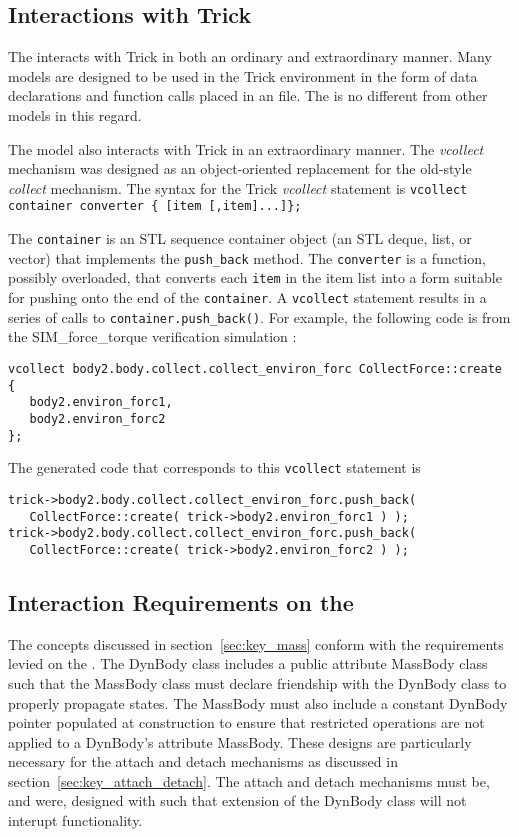 \subsection{Interactions with Trick}\label{sec:spec_interactions_trick}
The \ModelDesc interacts with Trick in both an ordinary and extraordinary
manner. Many models are designed to be used in the Trick environment in the
form of data declarations and function calls placed in an \Sdefine file. The
\ModelDesc is no different from other models in this regard.

The model also interacts with Trick in an extraordinary manner.
The \emph{vcollect} mechanism was designed as an object-oriented
replacement for the old-style \emph{collect} mechanism. The syntax for the
Trick \emph{vcollect} statement is
\verb+vcollect container converter { [item [,item]...]};+

The \verb+container+ is an STL sequence container object (an STL deque, list,
or vector) that implements the \verb+push_back+ method.
The \verb+converter+ is a function, possibly overloaded, that converts each
\verb+item+ in the item list into a form suitable for pushing onto the end of
the \verb+container+.
A \verb+vcollect+ statement results in a series of calls to
\verb+container.push_back()+. For example, the following code is from the
SIM\_force\_torque verification simulation \Sdefine:

\begin{verbatim}
vcollect body2.body.collect.collect_environ_forc CollectForce::create {
   body2.environ_forc1,
   body2.environ_forc2
};
\end{verbatim}

The generated code that corresponds to this \verb+vcollect+ statement is

\begin{verbatim}
trick->body2.body.collect.collect_environ_forc.push_back(
   CollectForce::create( trick->body2.environ_forc1 ) );
trick->body2.body.collect.collect_environ_forc.push_back(
   CollectForce::create( trick->body2.environ_forc2 ) );
\end{verbatim}

\subsection{Interaction Requirements on the \MASS}
The concepts discussed in section~\ref{sec:key_mass} conform with the
requirements levied on the \MASS.
The DynBody class includes a public attribute MassBody class such that 
the MassBody class must declare friendship with the DynBody class to properly 
propagate states. The MassBody must also include a constant DynBody pointer 
populated at construction to ensure that restricted operations are not applied 
to a DynBody's attribute MassBody.
These designs are particularly necessary for the attach and detach mechanisms 
as discussed in section~\ref{sec:key_attach_detach}. The attach and detach 
mechanisms must be, and were, designed with such that extension of the DynBody 
class will not interupt functionality. 

